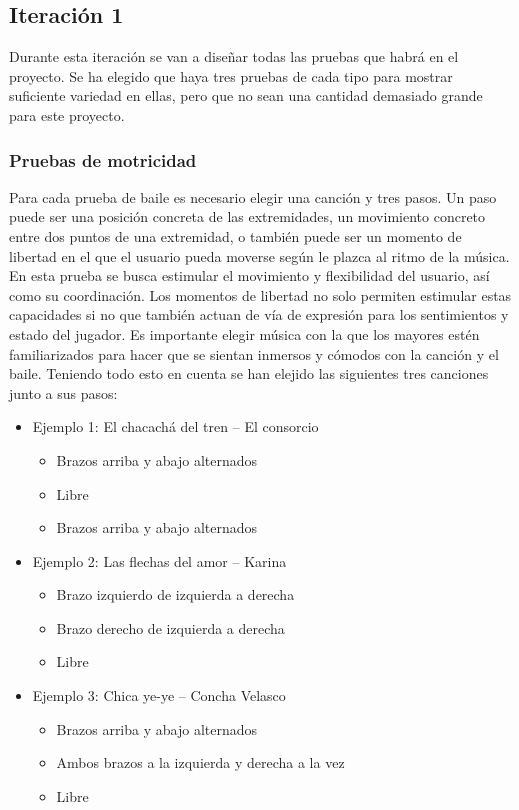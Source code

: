 
\subsection{Iteración 1}

Durante esta iteración se van a diseñar todas las pruebas que habrá en el proyecto. Se ha elegido que haya tres pruebas de cada tipo para mostrar suficiente variedad en ellas, pero que no sean una cantidad demasiado grande para este proyecto.


\subsubsection{Pruebas de motricidad}




Para cada prueba de baile es necesario elegir una canción y tres pasos. Un paso puede ser una posición concreta de las extremidades, un movimiento concreto entre dos puntos de una extremidad, o también puede ser un momento de libertad en el que el usuario pueda moverse según le plazca al ritmo de la música. En esta prueba se busca estimular el movimiento y flexibilidad del usuario, así como su coordinación. Los momentos de libertad no solo permiten estimular estas capacidades si no que también actuan de vía de expresión para los sentimientos y estado del jugador. Es importante elegir música con la que los mayores estén familiarizados para hacer que se sientan inmersos y cómodos con la canción y el baile. Teniendo todo esto en cuenta se han elejido las siguientes tres canciones junto a sus pasos:

\begin{itemize}
    
    \item {Ejemplo 1: El chacachá del tren – El consorcio
    \begin{itemize}
        \item {Brazos arriba y abajo alternados}
        \item {Libre}
        \item {Brazos arriba y abajo alternados}
    \end{itemize}}
    
    \item {Ejemplo 2: Las flechas del amor – Karina
    \begin{itemize}
        \item {Brazo izquierdo de izquierda a derecha}
        \item {Brazo derecho de izquierda a derecha}
        \item {Libre}
    \end{itemize}}
    
    \item {Ejemplo 3: Chica ye-ye – Concha Velasco
    \begin{itemize}
        \item {Brazos arriba y abajo alternados}
        \item {Ambos brazos a la izquierda y derecha a la vez}
        \item {Libre}
    \end{itemize}}

\end{itemize}

